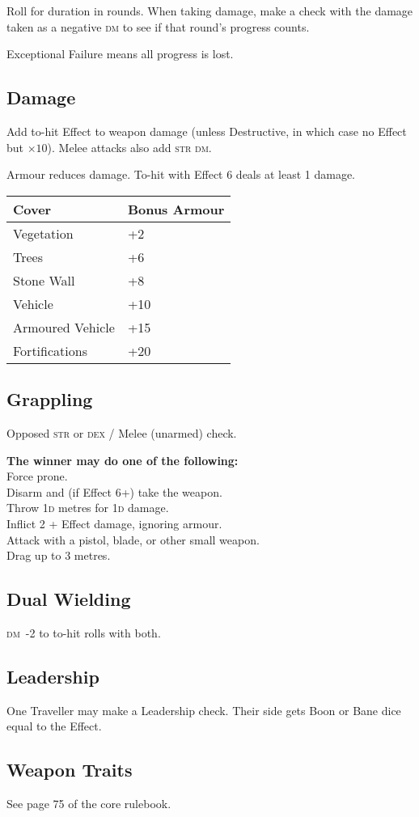 \documentclass[10pt]{article}
\newcommand\dice[1]{\textsc{#1}}
\newcommand{\oskillcheck}[3]{\textsc{#1} or \textsc{#2} / #3 check}
\newcommand{\diemod}[1]{\textsc{dm}~#1}
\begin{document}
\begin{multicols}{3}
Roll for duration in rounds.  When taking damage, make a check with
the damage taken as a negative \textsc{dm} to see if that round's
progress counts.

Exceptional Failure means all progress is lost.

\subsection{Damage}

Add to-hit Effect to weapon damage (unless Destructive, in which case
no Effect but $\times 10$).  Melee attacks also add \textsc{str}
\textsc{dm}.

Armour reduces damage.  To-hit with Effect 6 deals at least 1 damage.

\begin{tabularx}{\linewidth}{Xl} \toprule
Cover & Bonus Armour \\ \midrule
Vegetation & +2 \\
Trees & +6 \\
Stone Wall & +8 \\
Vehicle & +10 \\
Armoured Vehicle & +15 \\
Fortifications & +20 \\ \bottomrule
\end{tabularx}

\subsection{Grappling}

Opposed \oskillcheck{str}{dex}{Melee (unarmed)}.

\textbf{The winner may do one of the following:}\\
Force prone.\\
Disarm and (if Effect 6+) take the weapon.\\
Throw \dice{1d} metres for \dice{1d} damage.\\
Inflict 2 + Effect damage, ignoring armour.\\
Attack with a pistol, blade, or other small weapon.\\
Drag up to 3 metres.

\subsection{Dual Wielding}

\diemod{-2} to to-hit rolls with both.

\subsection{Leadership}

One Traveller may make a Leadership check.  Their side gets Boon or
Bane dice equal to the Effect.

\subsection{Weapon Traits}

See page 75 of the core rulebook.
\end{multicols}
\end{document}
